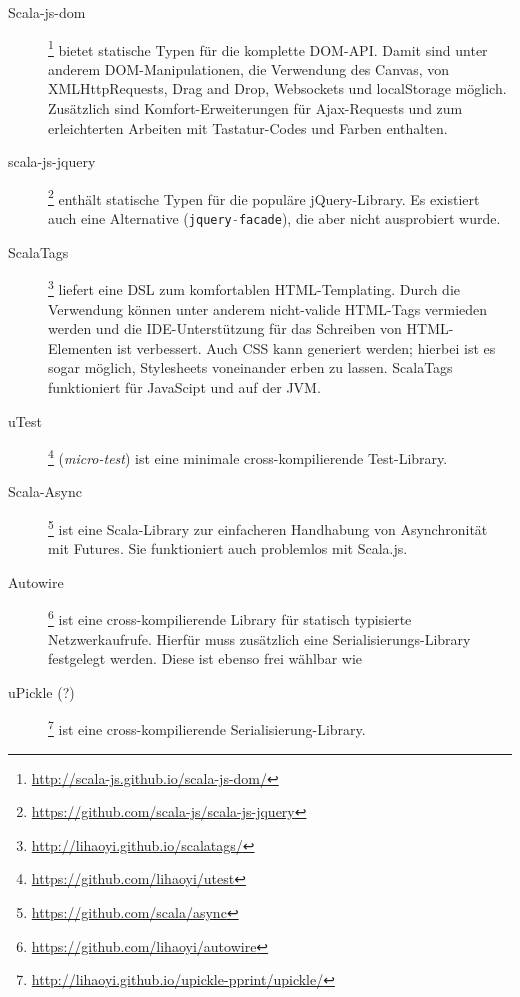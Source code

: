 \documentclass[a4paper, 12pt, hidelinks, listof=totoc, listoftables=totoc, bibliography=totoc]{scrreprt}
\newcommand{\code}[1]{\lstinline[language=Scala, style=inline]|#1|}
\begin{document}
\begin{description}
	\item[Scala-js-dom]\footnote{\url{http://scala-js.github.io/scala-js-dom/}} bietet statische Typen für die komplette \ac{DOM}-\ac{API}. Damit sind unter anderem DOM-Manipulationen, die Verwendung des Canvas, von XMLHttpRequests, Drag and Drop, Websockets und localStorage möglich. Zusätzlich sind Komfort-Erweiterungen für Ajax-Requests und zum erleichterten Arbeiten mit Tastatur-Codes und Farben enthalten.
	
	\item[scala-js-jquery]\footnote{\url{https://github.com/scala-js/scala-js-jquery}} enthält statische Typen für die populäre jQuery-Library. Es existiert auch eine Alternative (\code{jquery-facade}), die aber nicht ausprobiert wurde.
	
	\item[ScalaTags]\footnote{\url{http://lihaoyi.github.io/scalatags/}} liefert eine \ac{DSL} zum komfortablen \ac{HTML}-Templating. Durch die Verwendung können unter anderem nicht-valide \ac{HTML}-Tags vermieden werden und die \ac{IDE}-Unterstützung für das Schreiben von \ac{HTML}-Elementen ist verbessert. Auch \ac{CSS} kann generiert werden; hierbei ist es sogar möglich, Stylesheets voneinander erben zu lassen. ScalaTags funktioniert für JavaScipt und auf der \ac{JVM}.

	\item[uTest]\footnote{\url{https://github.com/lihaoyi/utest}} (\emph{micro-test}) ist eine minimale cross-kompilierende Test-Library.
	
	\item[Scala-Async]\footnote{\url{https://github.com/scala/async}} ist eine Scala-Library zur einfacheren Handhabung von Asynchronität mit Futures. Sie funktioniert auch problemlos mit Scala.js.
	
	\item[Autowire]\footnote{\url{https://github.com/lihaoyi/autowire}} ist eine cross-kompilierende Library für statisch typisierte Netzwerkaufrufe. Hierfür muss zusätzlich eine Serialisierungs-Library festgelegt werden. Diese ist ebenso frei wählbar wie 
	
	\item[uPickle (?)]\footnote{\url{http://lihaoyi.github.io/upickle-pprint/upickle/}} ist eine cross-kompilierende Serialisierung-Library.
\end{description}



\end{document}
